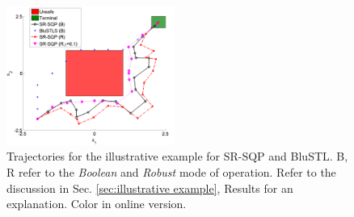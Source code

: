 \begin{figure}[t]
\centering
\includegraphics[width=0.49\textwidth]{figures/ToyExAllTrajs_scissored.pdf}
\vspace{-20pt}
\caption{{\small Trajectories for the illustrative example for SR-SQP and BluSTL. B, R refer to the \textit{Boolean} and \textit{Robust} mode of operation. Refer to the discussion in Sec. \ref{sec:illustrative example}}, Results for an explanation. Color in online version.}
\label{fig:toy control}
\vspace{-10pt}
\end{figure}